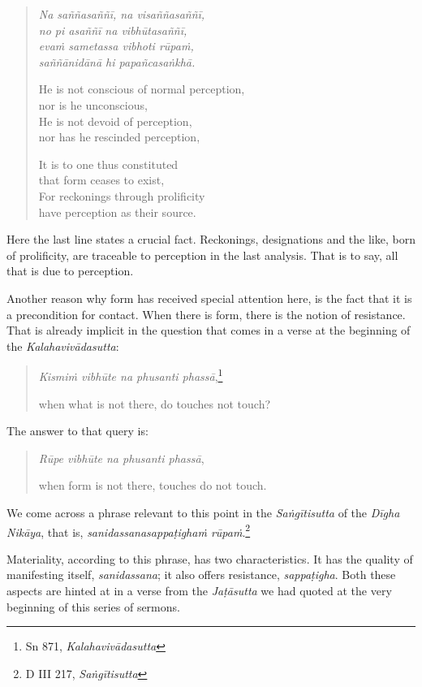 \begin{quote}
\emph{Na saññasaññī, na visaññasaññī,}\\
\emph{no pi asaññī na vibhūtasaññī,}\\
\emph{evaṁ sametassa vibhoti rūpaṁ,}\\
\emph{saññānidānā hi papañcasaṅkhā.}

He is not conscious of normal perception,\\
\vin nor is he unconscious,\\
He is not devoid of perception,\\
\vin nor has he rescinded perception,

\clearpage

It is to one thus constituted\\
\vin that form ceases to exist,\\
For reckonings through prolificity\\
\vin have perception as their source.
\end{quote}

Here the last line states a crucial fact. Reckonings, designations and the like, born of prolificity, are traceable to perception in the last analysis. That is to say, all that is due to perception.

Another reason why form has received special attention here, is the fact that it is a precondition for contact. When there is form, there is the notion of resistance. That is already implicit in the question that comes in a verse at the beginning of the \emph{Kalahavivādasutta}:

\begin{quote}
\emph{Kismiṁ vibhūte na phusanti phassā},\footnote{Sn 871, \emph{Kalahavivādasutta}}

when what is not there, do touches not touch?
\end{quote}

The answer to that query is:

\begin{quote}
\emph{Rūpe vibhūte na phusanti phassā},

when form is not there, touches do not touch.
\end{quote}

We come across a phrase relevant to this point in the \emph{Saṅgītisutta} of the \emph{Dīgha Nikāya}, that is, \emph{sanidassanasappaṭighaṁ rūpaṁ}.\footnote{D III 217, \emph{Saṅgītisutta}}

Materiality, according to this phrase, has two characteristics. It has the quality of manifesting itself, \emph{sanidassana}; it also offers resistance, \emph{sappaṭigha}. Both these aspects are hinted at in a verse from the \emph{Jaṭāsutta} we had quoted at the very beginning of this series of sermons.


